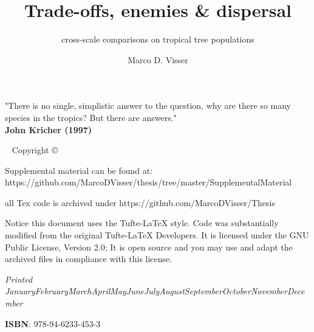 \documentclass[b5paper,justified]{tufte-book} %
\title{Trade-offs, enemies \& dispersal }
\subtitle{cross-scale comparisons on tropical tree populations}
\author[Marco D. Visser]{Marco D. Visser} %
\newcommand{\monthyear}{\ifcase\month\or January\or February\or March\or April\or May\or June\or July\or August\or September\or October\or November\or December\fi\space\number\year} %
\begin{document}
\frontmatter

\thispagestyle{empty}
\clearpage
\vspace*{\fill}
\begin{center}
\begin{minipage}{.6\textwidth}
"There is no single, simplistic answer to the question, why are there so many species in the tropics? But there are answers." \\
\textbf{John Kricher (1997)}
\end{minipage}
\end{center}
\vfill %
\clearpage



\maketitle %


\newpage
\begin{fullwidth}
~\vfill
\thispagestyle{empty}
\setlength{\parindent}{0pt}
\setlength{\parskip}{\baselineskip}
Copyright \copyright\ \the\year\ \thanklessauthor

\par{}

\par Supplemental material can be found at: \\ https://github.com/MarcoDVisser/thesis/tree/master/SupplementalMaterial

\par all Tex code is archived under https://github.com/MarcoDVisser/Thesis

\par Notice this document uses the Tufte-LaTeX style. Code was substantially modified from the original Tufte-LaTeX Developers. It is licensed under the GNU Public License, Version 2.0; It is open source and you may use and adapt the archived files in compliance with this license. 

\par\textit{Printed \monthyear} 
\par\textbf{ISBN}: 978-94-6233-453-3

\end{fullwidth}
\end{document}
